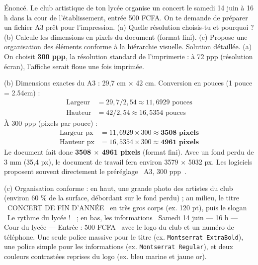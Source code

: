 \documentclass[11pt]{article}
\begin{document}
\begin{exoresolu}
Énoncé. Le club artistique de ton lycée organise un concert le samedi 14 juin à 16 h dans la cour de l'établissement, entrée 500 FCFA. On te demande de préparer un fichier A3 prêt pour l'impression. (a) Quelle résolution choisis-tu et pourquoi ? (b) Calcule les dimensions en pixels du document (format fini). (c) Propose une organisation des éléments conforme à la hiérarchie visuelle.
\tcblower
Solution détaillée.
(a) On choisit \textbf{300 ppp}, la résolution standard de l'imprimerie : à 72 ppp (résolution écran), l'affiche serait floue une fois imprimée.

(b) Dimensions exactes du A3 : 29,7 cm $\times$ 42 cm.
Conversion en pouces (1 pouce = 2.54cm) :
\begin{align*}
\text{Largeur}  &= 29,7 / 2,54 \approx 11,6929 \text{ pouces} \\
\text{Hauteur} &= 42 / 2,54 \approx 16,5354 \text{ pouces}
\end{align*}
À 300 ppp (pixels par pouce) :
\begin{align*}
\text{Largeur px}  &= 11,6929 \times 300 \approx \textbf{3508 pixels} \\
\text{Hauteur px} &= 16,5354 \times 300 \approx \textbf{4961 pixels}
\end{align*}
Le document fait donc \textbf{3508 $\times$ 4961 pixels} (format fini). Avec un fond perdu de 3 mm (35,4 px), le document de travail fera environ 3579 $\times$ 5032 px. Les logiciels proposent souvent directement le préréglage \og~A3, 300 ppp~\fg{}.

(c) Organisation conforme : en haut, une grande photo des artistes du club (environ 60 \% de la surface, débordant sur le fond perdu) ; au milieu, le titre \og~CONCERT DE FIN D'ANNÉE~\fg{} en très gros corps (ex. 120 pt), puis le slogan \og~Le rythme du lycée !~\fg{} ; en bas, les informations \og~Samedi 14 juin — 16 h — Cour du lycée — Entrée : 500 FCFA~\fg{} avec le logo du club et un numéro de téléphone. Une seule police massive pour le titre (ex. \texttt{Montserrat ExtraBold}), une police simple pour les informations (ex. \texttt{Montserrat Regular}), et deux couleurs contrastées reprises du logo (ex. bleu marine et jaune or).
\end{exoresolu}
\end{document}
